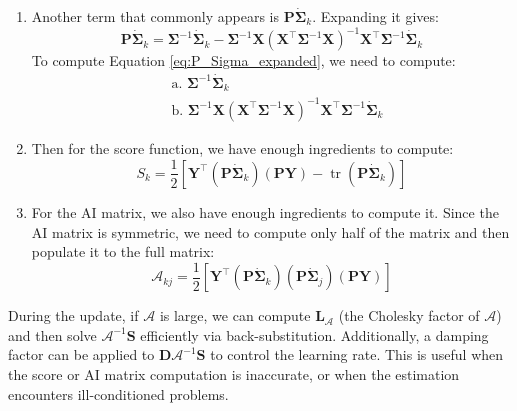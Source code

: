 \documentclass[
  letterpaper,
  DIV=11,
  numbers=noendperiod]{scrartcl}
\begin{document}
\begin{enumerate}
\begin{align}
  &\text{i. } \symbf{\Sigma}^{-1} \symbf{X} (\symbf{X}^\top \symbf{\Sigma}^{-1} \symbf{X})^{-1} \symbf{X}^\top \symbf{\Sigma}^{-1} \symbf{Y} \nonumber
  \end{align} Note that we use Cholesky operations to avoid inverting
  large symmetric matrices.
\item
  Another term that commonly appears is
  \(\symbf{P} \dot{\symbf{\Sigma}}_k\). Expanding it gives:
  \begin{equation}
  \symbf{P} \dot{\symbf{\Sigma}}_k = \symbf{\Sigma}^{-1}\dot{\symbf{\Sigma}}_k - \symbf{\Sigma}^{-1}\symbf{X}(\symbf{X}^\top\symbf{\Sigma}^{-1}\symbf{X})^{-1}\symbf{X}^\top\symbf{\Sigma}^{-1}\dot{\symbf{\Sigma}}_k
  \label{eq:P_Sigma_expanded}
  \end{equation} To compute Equation \eqref{eq:P_Sigma_expanded}, we
  need to compute: \begin{align}
  &\text{a. } \symbf{\Sigma}^{-1} \dot{\symbf{\Sigma}}_k \nonumber \\
  &\text{b. } \symbf{\Sigma}^{-1} \symbf{X} (\symbf{X}^\top \symbf{\Sigma}^{-1} \symbf{X})^{-1} \symbf{X}^\top \symbf{\Sigma}^{-1} \dot{\symbf{\Sigma}}_k \nonumber
  \end{align}
\item
  Then for the score function, we have enough ingredients to compute:
  \begin{equation}
  S_k = \frac{1}{2}\left[\symbf{Y}^\top (\symbf{P} \dot{\symbf{\Sigma}}_k) (\symbf{P}\symbf{Y}) - \operatorname{tr}(\symbf{P} \dot{\symbf{\Sigma}}_k)\right]
  \label{eq:score_computed}
  \end{equation}
\item
  For the AI matrix, we also have enough ingredients to compute it.
  Since the AI matrix is symmetric, we need to compute only half of the
  matrix and then populate it to the full matrix: \begin{equation}
  \mathcal{A}_{kj} = \frac{1}{2}\left[\symbf{Y}^\top (\symbf{P} \dot{\symbf{\Sigma}}_k) (\symbf{P} \dot{\symbf{\Sigma}}_j) (\symbf{P}\symbf{Y})\right]
  \label{eq:AI_computed}
  \end{equation}
\end{enumerate}

During the update, if \(\mathcal{A}\) is large, we can compute
\(\symbf{L}_{\mathcal{A}}\) (the Cholesky factor of \(\mathcal{A}\)) and
then solve \(\mathcal{A}^{-1} \symbf{S}\) efficiently via
back-substitution. Additionally, a damping factor can be applied to
\(\symbf{D} \mathcal{A}^{-1} \symbf{S}\) to control the learning rate.
This is useful when the score or AI matrix computation is inaccurate, or
when the estimation encounters ill-conditioned problems.
\end{document}
